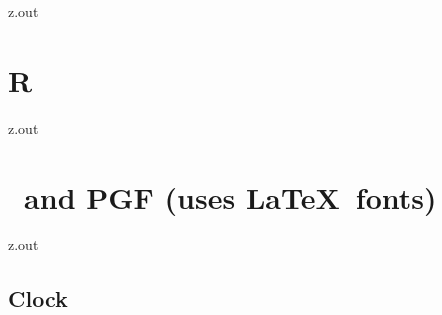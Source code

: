 \begin{VerbatimOut}{z.out}

\section{R}
\end{VerbatimOut}

\MyIO


\begin{VerbatimOut}{z.out}

\section{\TikZLogo\ and PGF (uses \LaTeX\ fonts)}
\end{VerbatimOut}

\MyIO


\begin{VerbatimOut}{z.out}

\subsection{Clock}
\end{VerbatimOut}

\MyIO


